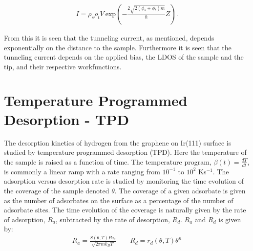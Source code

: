 \begin{align}
  I = \rho_s \rho_t V \: \text{exp}\left(-\frac{2\sqrt{2(\phi_s+\phi_t)m}}{\hbar}Z \right).
  \label{eq:TC}
\end{align}

From this it is seen that the tunneling current, as mentioned, depends exponentially on the distance to the sample. Furthermore it is seen that the tunneling current depends on the applied bias, the LDOS of the sample and the tip, and their respective workfunctions.

\section{Temperature Programmed Desorption - TPD}

The desorption kinetics of hydrogen from the graphene on Ir(111) surface is studied by temperature programmed desorption (TPD). Here the temperature of the sample is raised as a function of time. The temperature program, $\beta (t) = \frac{dT}{dt}$, is commonly a linear ramp with a rate ranging from $10^{-1}$ to $10^2$ Ks$^{-1}$.\cite{TPDbog} The adsorption versus desorption rate is studied by monitoring the time evolution of the coverage of the sample denoted $\theta$. The coverage of a given adsorbate is given as the number of adsorbates on the surface as a percentage of the number of adsorbate sites. The time evolution of the coverage is naturally given by the rate of adsorption, $R_a$, subtracted by the rate of desorption, $R_d$. $R_a$ and $R_d$ is given by:\cite{TPDbog}
\begin{align}
R_a = \frac{S(\theta , T) P a_s}{\sqrt{2\pi m k_B T}} \qquad R_d = r_d(\theta, T)\theta^n
\end{align}

